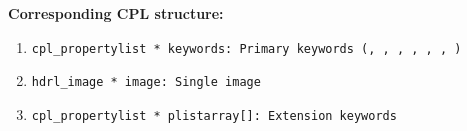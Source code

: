 \begin{datastructdef}
\textbf{Corresponding \ac{CPL} structure:}
\begin{enumerate}
    \item \texttt{cpl\_propertylist * keywords: Primary keywords (\hyperref[fits:dpr.catg]{},  \hyperref[fits:dpr.tech]{},  \hyperref[fits:dpr.type]{},  \hyperref[fits:ins.opti3.name]{},  \hyperref[fits:ins.opti9.name]{},  \hyperref[fits:ins.opti10.name]{}, \hyperref[fits:ins.opti20.name]{})}
    \item \texttt{hdrl\_image * image: Single image}
    \item \texttt{cpl\_propertylist * plistarray[]: Extension keywords}
\end{enumerate}
\end{datastructdef}

